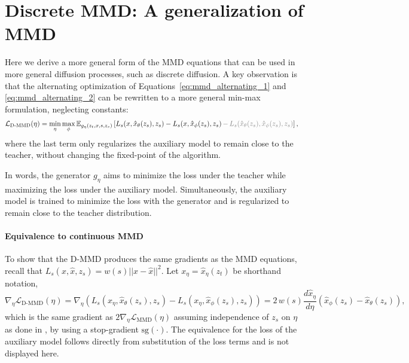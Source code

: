 \section{Discrete MMD: A generalization of MMD}
\label{sec:d_mmd}

Here we derive a more general form of the MMD equations that can be used in more general diffusion processes, such as discrete diffusion. A key observation is that the alternating optimization of Equations~\ref{eq:mmd_alternating_1} and \ref{eq:mmd_alternating_2} can be rewritten to a more general min-max formulation, neglecting constants:
\begin{align}\label{eq:d-mmd}
    \mathcal{L}_{\text{D-MMD}}(\eta) &= \min_\eta \max_\phi \mathbb{E}_{g_\eta(z_t, x, s, z_s)}\left[L_s(x, \hat{x}_\theta(z_s), z_s) -  L_s(x, \hat{x}_\phi(z_s), z_s) \textcolor{gray}{\, - \, L_s(\hat{x}_{\theta}(z_s), \hat{x}_\phi(z_s), z_s)} \right],
\end{align}
where the last term only regularizes the auxiliary model to remain close to the teacher, without changing the fixed-point of the algorithm.

In words, the generator $g_\eta$ aims to minimize the loss under the teacher while maximizing the loss under the auxiliary model. Simultaneously, the auxiliary model is trained to minimize the loss with the generator and is regularized to remain close to the teacher distribution.

\paragraph{Equivalence to continuous MMD}
To show that the D-MMD produces the same gradients as the MMD equations, recall that $L_s(x, \hat{x}, z_s) = w(s) ||x - \hat{x}||^2$. Let $x_{\eta} = \hat{x}_\eta(z_t)$ be shorthand notation,
\begin{equation}
    \nabla_\eta \mathcal{L}_{\text{D-MMD}}(\eta) = \nabla_\eta \left( L_s(x_{\eta}, \hat{x}_\theta(z_s), z_s) -  L_s(x_{\eta}, \hat{x}_\phi(z_s), z_s) \right) = 2\, w(s) \frac{d \hat{x}_\eta}{d\eta} \left( \hat{x}_\phi(z_s) - \hat{x}_\theta(z_s)\right),
\end{equation}
which is the same gradient as $2\nabla_\eta \mathcal{L}_{\text{MMD}}(\eta)$ assuming independence of $z_s$ on $\eta$ as done in \citet{salimans2024multistep}, by using a stop-gradient $\mathrm{sg(\cdot)}$. The equivalence for the loss of the auxiliary model
follows directly from substitution of the loss terms and is not displayed here.

